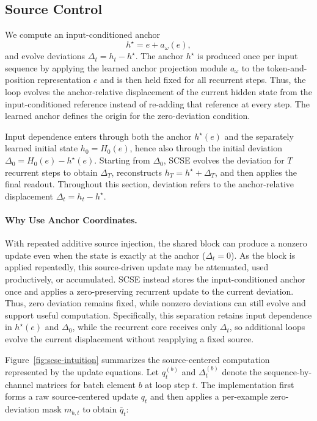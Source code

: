 \documentclass[letterpaper]{article} %
\newcommand{\SCSE}{\textsc{SCSE}}
\theoremstyle{remark}
\begin{document}
\subsection{Source Control}
We compute an input-conditioned anchor
\begin{equation}
	h^\star=e+a_\omega(e),
\end{equation}
and evolve deviations $\Delta_t=h_t-h^\star$.  The anchor $h^\star$ is produced once per input sequence by applying the learned anchor projection module $a_\omega$ to the token-and-position representation $e$ and is then held fixed for all recurrent steps.  Thus, the loop evolves the anchor-relative displacement of the current hidden state from the input-conditioned reference instead of re-adding that reference at every step.  The learned anchor defines the origin for the zero-deviation condition.

Input dependence enters through both the anchor $h^\star(e)$ and the separately learned initial state $h_0=H_0(e)$, hence also through the initial deviation $\Delta_0=H_0(e)-h^\star(e)$.  Starting from $\Delta_0$, \SCSE{} evolves the deviation for $T$ recurrent steps to obtain $\Delta_T$, reconstructs $h_T=h^\star+\Delta_T$, and then applies the final readout.  Throughout this section, deviation refers to the anchor-relative displacement $\Delta_t=h_t-h^\star$.

\paragraph{Why Use Anchor Coordinates.} With repeated additive source injection, the shared block can produce a nonzero update even when the state is exactly at the anchor ($\Delta_t=0$).  As the block is applied repeatedly, this source-driven update may be attenuated, used productively, or accumulated.  \SCSE{} instead stores the input-conditioned anchor once and applies a zero-preserving recurrent update to the current deviation.  Thus, zero deviation remains fixed, while nonzero deviations can still evolve and support useful computation.  Specifically, this separation retains input dependence in $h^\star(e)$ and $\Delta_0$, while the recurrent core receives only $\Delta_t$, so additional loops evolve the current displacement without reapplying a fixed source.

Figure~\ref{fig:scse-intuition} summarizes the source-centered computation represented by the update equations.  Let $q_t^{(b)}$ and $\Delta_t^{(b)}$ denote the sequence-by-channel matrices for batch element $b$ at loop step $t$.  The implementation first forms a raw source-centered update $q_t$ and then applies a per-example zero-deviation mask $m_{b,t}$ to obtain $\bar q_t$:
\end{document}
